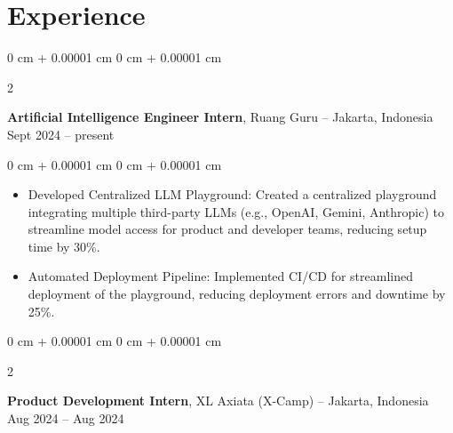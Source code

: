 \documentclass[10pt, letterpaper]{article}
\newenvironment{highlights}{
    \begin{itemize}[
        topsep=0.10 cm,
        parsep=0.10 cm,
        partopsep=0pt,
        itemsep=0pt,
        leftmargin=0 cm + 10pt
    ]
}{
    \end{itemize}
} %
\newenvironment{onecolentry}{
    \begin{adjustwidth}{
        0 cm + 0.00001 cm
    }{
        0 cm + 0.00001 cm
    }
}{
    \end{adjustwidth}
} %
\newenvironment{twocolentry}[2][]{
    \onecolentry
    \def\secondColumn{#2}
    \setcolumnwidth{\fill, 4.5 cm}
    \begin{paracol}{2}
}{
    \switchcolumn \raggedleft \secondColumn
    \end{paracol}
    \endonecolentry
} %
\begin{document}
    
    \section{Experience}



        
        \begin{twocolentry}{
            Sept 2024 – present
        }
            \textbf{Artificial Intelligence Engineer Intern}, Ruang Guru -- Jakarta, Indonesia\end{twocolentry}

        \vspace{0.10 cm}
        \begin{onecolentry}
            \begin{highlights}
                \item Developed Centralized LLM Playground: Created a centralized playground integrating multiple third-party LLMs (e.g., OpenAI, Gemini, Anthropic) to streamline model access for product and developer teams, reducing setup time by 30\%.
                \item Automated Deployment Pipeline: Implemented CI/CD for streamlined deployment of the playground, reducing deployment errors and downtime by 25\%.
            \end{highlights}
        \end{onecolentry}


        \vspace{0.2 cm}

        \begin{twocolentry}{
            Aug 2024 – Aug 2024
        }
            \textbf{Product Development Intern}, XL Axiata (X-Camp) -- Jakarta, Indonesia\end{twocolentry}
\end{document}
